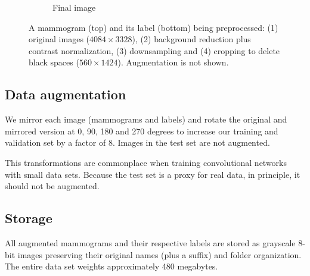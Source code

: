 \begin{figure}[h]
\begin{subfigure}{2.4 cm}
		\caption{Final image}
		\label{subfig:Preprocessingd}
        \end{subfigure}
	\caption[Preprocessing pipeline]{A mammogram (top) and its label (bottom) being preprocessed: (1) original images ($4084 \times 3328$), (2) background reduction plus contrast normalization, (3) downsampling and  (4) cropping to delete black spaces ($560 \times 1424$). Augmentation is not shown.}
	 \label{fig:Preprocessing}
\end{figure}
	
\subsection{Data augmentation}
We mirror each image (mammograms and labels) and rotate the original and mirrored version at 0, 90, 180 and 270 degrees to increase our training and validation set by a factor of 8. 
Images in the test set are not augmented.

This transformations are commonplace when training convolutional networks with small data sets. Because the test set is a proxy for real data, in principle, it should not be augmented.%


\subsection{Storage}
All augmented mammograms and their respective labels are stored as grayscale 8-bit images preserving their original names (plus a suffix) and folder organization.
The entire data set weights approximately 480 megabytes.
